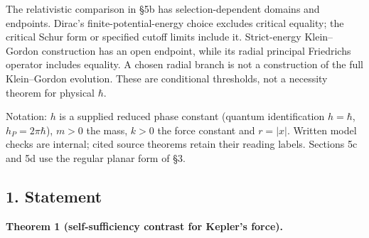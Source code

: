 \documentclass[11pt,a4paper]{article}
\begin{document}
The relativistic comparison in §5b has selection-dependent domains and
endpoints. Dirac's finite-potential-energy choice excludes critical
equality; the critical Schur form or specified cutoff limits include it.
Strict-energy Klein--Gordon construction has an open endpoint, while its
radial principal Friedrichs operator includes equality. A chosen radial
branch is not a construction of the full Klein--Gordon evolution. These
are conditional thresholds, not a necessity theorem for physical
\(\hbar\).

Notation: \(h\) is a supplied reduced phase constant (quantum
identification \(h=\hbar\), \(h_P=2\pi\hbar\)), \(m>0\) the mass,
\(k>0\) the force constant and \(r=|x|\). Written model checks are
internal; cited source theorems retain their reading labels. Sections 5c
and 5d use the regular planar form of §3.

\subsection{1. Statement}\label{statement}

\textbf{Theorem 1 (self-sufficiency contrast for Kepler's force).}
\end{document}
